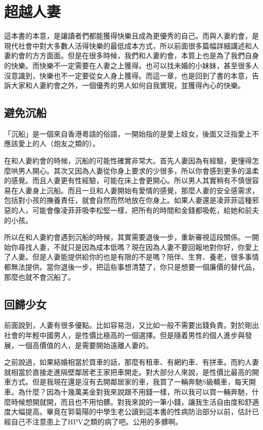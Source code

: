 \chapter{超越人妻}

這本書的本意，是讓讀者們都能獲得快樂且成為更優秀的自己。而與人妻約會，是現代社會中對大多數人活得快樂的最低成本方式，所以前面很多篇幅詳細講述和人妻約會的方方面面。但是在很多時候，我們和人妻約會，本質上也是為了我們自身的快樂。而快樂不一定需要在人妻之上獲得。也可以找未婚的小妹妹，甚至很多人沒意識到，快樂也不一定要從女人身上獲得。而這一章，也是回到了書的本意，告訴大家和人妻約會之外，一個優秀的男人如何自我實現，並獲得內心的快樂。

\section{避免沉船}

「沉船」是一個來自香港粵語的俗語，一開始指的是愛上妓女，後面又泛指愛上不應該愛上的人（炮友之類的）。

在和人妻約會的時候，沉船的可能性確實非常大。首先人妻因為有經驗，更懂得怎麼哄男人開心。其次又因為人妻從你身上要求的少很多，所以你會感到更多的溫柔的感覺。而且人妻更有性經驗，可能在床上會更開心。所以男人其實稍有不慎很容易在人妻身上沉船。而且一旦和人妻開始有愛情的感覺，那麼人妻的安全感需求，包括對小孩的撫養責任，就會自然而然地放在你身上。如果人妻還是凌菲菲這種邪惡的人，可能會像凌菲菲吸李松堅一樣，把所有的時間和金錢都吸乾，給她和前夫的小孩。

所以在和人妻約會遇到沉船的時候，其實需要退後一步，重新審視這段關係。一開始你尋找人妻，不就只是因為成本低嗎？現在因為人妻不要回報地對你好，你愛上了人妻。但是人妻能提供給你的也是有限的不是嗎？陪伴、生育、養老，很多事情都無法提供。當你退後一步，把這些事想清楚了，你只是想要一個廉價的替代品，那麼也就不會沉船了。

\section{回歸少女}

前面說到，人妻有很多優點。比如容易泡，又比如一般不需要出錢負責。對於剛出社會的年輕中國男人，是性價比極高的一個選擇。但是隨着男性的個人進步與發展，一個高價值的人，是需要開始遠離人妻的。

之前說過，如果結婚相當於買車的話，那麼有租車、有網約車、有拼車。而約人妻就相當於直接走進隔壁鄰居老王家把車開走。對大部分人來說，是性價比最高的開車方式。但是我現在還是沒有去開鄰居家的車，我買了一輛奔馳S級轎車，每天開車。為什麼？因為十幾萬美金對我來說跟不用錢一樣，所以我可以買一輛奔馳，什麼時候想開就開，而且也不用怕髒。對我來說的一筆小錢，讓我生活自由度和舒適度大幅提高。畢竟在郭菊陽的中學生老公讀到這本書的性病防治部分以前，估計已經自己不注意患上了HPV之類的病了吧。公用的多髒啊。


